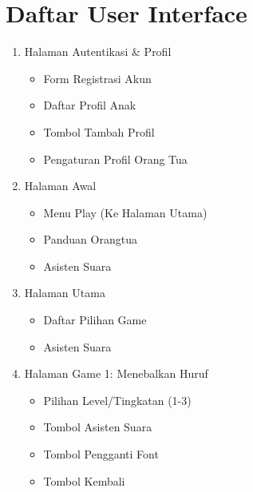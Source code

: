 \documentclass[12pt,a4paper]{report}
\begin{document}

\chapter*{Daftar User Interface}

\begin{enumerate}
\item Halaman Autentikasi \& Profil
    \begin{itemize}
    \item Form Registrasi Akun
    \item Daftar Profil Anak
    \item Tombol Tambah Profil
    \item Pengaturan Profil Orang Tua
    \end{itemize}

\item Halaman Awal
    \begin{itemize}
    \item Menu Play (Ke Halaman Utama)
    \item Panduan Orangtua
    \item Asisten Suara
    \end{itemize}

\item Halaman Utama
    \begin{itemize}
    \item Daftar Pilihan Game
    \item Asisten Suara
    \end{itemize}

\item Halaman Game 1: Menebalkan Huruf
    \begin{itemize}
    \item Pilihan Level/Tingkatan (1-3)
    \item Tombol Asisten Suara
    \item Tombol Pengganti Font
    \item Tombol Kembali
    \end{itemize}
    

\end{enumerate}
\end{document}
